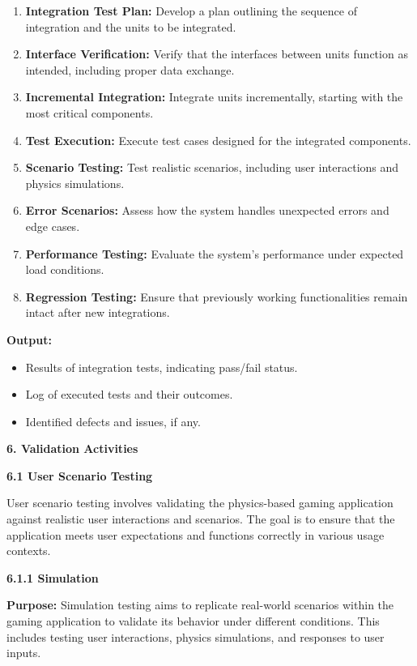 \documentclass[
]{article}
\begin{document}
\begin{enumerate}
\def\labelenumi{\arabic{enumi}.}
\item
  \textbf{Integration Test Plan:} Develop a plan outlining the sequence
  of integration and the units to be integrated.
\item
  \textbf{Interface Verification:} Verify that the interfaces between
  units function as intended, including proper data exchange.
\item
  \textbf{Incremental Integration:} Integrate units incrementally,
  starting with the most critical components.
\item
  \textbf{Test Execution:} Execute test cases designed for the
  integrated components.
\item
  \textbf{Scenario Testing:} Test realistic scenarios, including user
  interactions and physics simulations.
\item
  \textbf{Error Scenarios:} Assess how the system handles unexpected
  errors and edge cases.
\item
  \textbf{Performance Testing:} Evaluate the system's performance under
  expected load conditions.
\item
  \textbf{Regression Testing:} Ensure that previously working
  functionalities remain intact after new integrations.
\end{enumerate}

\textbf{Output:}

\begin{itemize}
\item
  Results of integration tests, indicating pass/fail status.
\item
  Log of executed tests and their outcomes.
\item
  Identified defects and issues, if any.
\end{itemize}

\textbf{6. Validation Activities}

\textbf{6.1 User Scenario Testing}

User scenario testing involves validating the physics-based gaming
application against realistic user interactions and scenarios. The goal
is to ensure that the application meets user expectations and functions
correctly in various usage contexts.

\textbf{6.1.1 Simulation}

\textbf{Purpose:} Simulation testing aims to replicate real-world
scenarios within the gaming application to validate its behavior under
different conditions. This includes testing user interactions, physics
simulations, and responses to user inputs.
\end{document}
